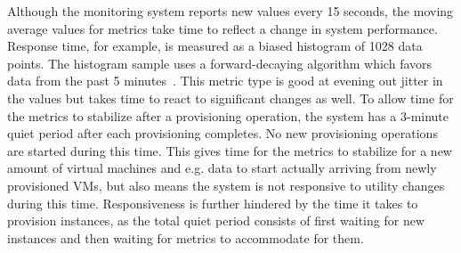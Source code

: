 \documentclass[english]{tktltiki2}
\theoremstyle{definition}
\theoremstyle{remark}
\begin{document}
Although the monitoring system reports new values every 15 seconds, the moving
average values for metrics take time to reflect a change in system performance.
Response time, for example, is measured as a biased histogram of 1028 data
points. The histogram sample uses a forward-decaying algorithm which favors data
from the past 5 minutes~\cite{forwardDecayHistogram}\cite{codahaleHistogram}.
This metric type is good at evening out jitter in the values but takes time to
react to significant changes as well. To allow time for the metrics to stabilize
after a provisioning operation, the system has a 3-minute quiet period after
each provisioning completes. No new provisioning operations are started during
this time. This gives time for the metrics to stabilize for a new amount of
virtual machines and e.g. data to start actually arriving from newly provisioned
VMs, but also means the system is not responsive to utility changes during this
time. Responsiveness is further hindered by the time it takes to provision instances, as the total quiet period consists of first waiting for new instances and then waiting for metrics to accommodate for them.

	\begin{table}[h]
	    \caption{Server applications and tools used in the prototype.}
	    \label{table:componentVersions}
	\end{table}
\end{document}
